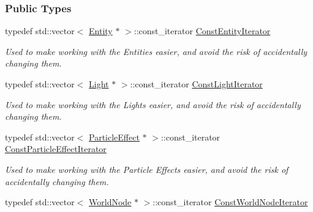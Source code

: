 \subsubsection*{Public Types}
\begin{DoxyCompactItemize}
\item 
\hypertarget{classMezzanine_1_1SceneManager_a4fb46d68331a77da9036a3f704f7ee40}{
typedef std::vector$<$ \hyperlink{classMezzanine_1_1Entity}{Entity} $\ast$ $>$::const\_\-iterator \hyperlink{classMezzanine_1_1SceneManager_a4fb46d68331a77da9036a3f704f7ee40}{ConstEntityIterator}}
\label{classMezzanine_1_1SceneManager_a4fb46d68331a77da9036a3f704f7ee40}

\begin{DoxyCompactList}\small\item\em Used to make working with the Entities easier, and avoid the risk of accidentally changing them. \item\end{DoxyCompactList}\item 
\hypertarget{classMezzanine_1_1SceneManager_ad4f4649f45b71ddc0d728e64facd03c3}{
typedef std::vector$<$ \hyperlink{classMezzanine_1_1Light}{Light} $\ast$ $>$::const\_\-iterator \hyperlink{classMezzanine_1_1SceneManager_ad4f4649f45b71ddc0d728e64facd03c3}{ConstLightIterator}}
\label{classMezzanine_1_1SceneManager_ad4f4649f45b71ddc0d728e64facd03c3}

\begin{DoxyCompactList}\small\item\em Used to make working with the Lights easier, and avoid the risk of accidentally changing them. \item\end{DoxyCompactList}\item 
\hypertarget{classMezzanine_1_1SceneManager_aa99ab0f491a991bda63127519b40b04f}{
typedef std::vector$<$ \hyperlink{classMezzanine_1_1ParticleEffect}{ParticleEffect} $\ast$ $>$::const\_\-iterator \hyperlink{classMezzanine_1_1SceneManager_aa99ab0f491a991bda63127519b40b04f}{ConstParticleEffectIterator}}
\label{classMezzanine_1_1SceneManager_aa99ab0f491a991bda63127519b40b04f}

\begin{DoxyCompactList}\small\item\em Used to make working with the Particle Effects easier, and avoid the risk of accidentally changing them. \item\end{DoxyCompactList}\item 
\hypertarget{classMezzanine_1_1SceneManager_a39bddd192e396e2e7cf92bca33b4d03c}{
typedef std::vector$<$ \hyperlink{classMezzanine_1_1WorldNode}{WorldNode} $\ast$ $>$::const\_\-iterator \hyperlink{classMezzanine_1_1SceneManager_a39bddd192e396e2e7cf92bca33b4d03c}{ConstWorldNodeIterator}}
\label{classMezzanine_1_1SceneManager_a39bddd192e396e2e7cf92bca33b4d03c}


\end{DoxyCompactItemize}
